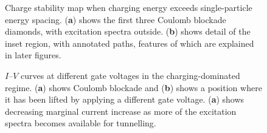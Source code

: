 \documentclass[a4paper,11pt]{article}
\begin{document}
    \begin{figure}[p]
    \begin{center}
        \caption{Charge stability map when charging energy exceeds single-particle energy spacing. (\textbf{a}) shows the first three Coulomb blockade diamonds, with excitation spectra outside. (\textbf{b}) shows detail of the inset region, with annotated paths, features of which are explained in later figures.}
        \label{fig:Zoom}
    \end{center}
    \end{figure}

    \begin{figure}[p]
    \begin{center}
        \caption{$I$--$V$ curves at different gate voltages in the charging-dominated regime. (\textbf{a}) shows Coulomb blockade and (\textbf{b}) shows a position where it has been lifted by applying a different gate voltage. (\textbf{a}) shows decreasing marginal current increase as more of the excitation spectra becomes available for tunnelling.}
        \label{fig:IV_curve}
    \end{center}
    \end{figure}
\end{document}
